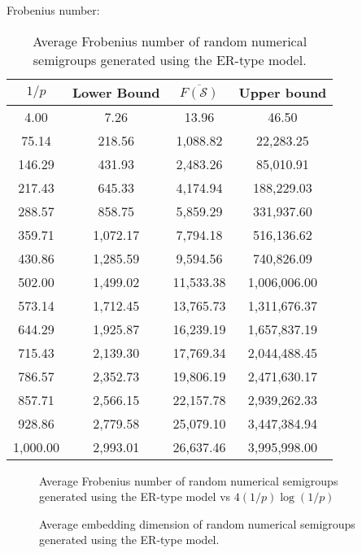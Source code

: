 Frobenius number:
\begin{table}
\centering
\begin{tabular}{|c|c|c|c|}
    \hline
    $1/p$ & Lower Bound & $\overline{F(\mathcal{S})}$ & Upper bound \\
    \hline
    4.00 & 7.26 & 13.96 & 46.50 \\
    75.14 & 218.56 & 1,088.82 & 22,283.25 \\
    146.29 & 431.93 & 2,483.26 & 85,010.91 \\
    217.43 & 645.33 & 4,174.94 & 188,229.03 \\
    288.57 & 858.75 & 5,859.29 & 331,937.60 \\
    359.71 & 1,072.17 & 7,794.18 & 516,136.62 \\
    430.86 & 1,285.59 & 9,594.56 & 740,826.09 \\
    502.00 & 1,499.02 & 11,533.38 & 1,006,006.00 \\
    573.14 & 1,712.45 & 13,765.73 & 1,311,676.37 \\
    644.29 & 1,925.87 & 16,239.19 & 1,657,837.19 \\
    715.43 & 2,139.30 & 17,769.34 & 2,044,488.45 \\
    786.57 & 2,352.73 & 19,806.19 & 2,471,630.17 \\
    857.71 & 2,566.15 & 22,157.78 & 2,939,262.33 \\
    928.86 & 2,779.58 & 25,079.10 & 3,447,384.94 \\
    1,000.00 & 2,993.01 & 26,637.46 & 3,995,998.00 \\
    \hline
\end{tabular}
\caption{Average Frobenius number of random numerical semigroups generated using the ER-type model.}
\label{tab:frobenius}
\end{table}

\begin{figure}
    \begin{center}
        
    \end{center}
    \caption{Average Frobenius number of random numerical semigroups generated using the ER-type model vs $4(1/p)\log(1/p)$}
    \label{fig:frobenius}
\end{figure}
    
\begin{figure}
    \begin{center}
        
    \end{center}
    \caption{Average embedding dimension of random numerical semigroups generated using the ER-type model.}
    \label{fig:embedding}
\end{figure}

